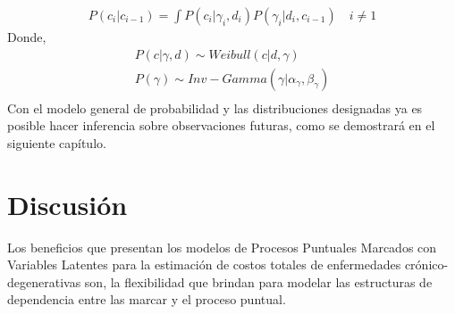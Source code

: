 \begin{align*}
P(c_i|c_{i-1})=\int P(c_i|\gamma_i,d_i)P(\gamma_i|d_i,c_{i-1}) \quad i \neq 1
\end{align*}
Donde,
\begin{align*}
P(c|\gamma,d) \sim Weibull(c|d,\gamma)\\
P(\gamma) \sim Inv-Gamma(\gamma|\alpha_\gamma,\beta_\gamma)\\
\end{align*}
Con el modelo general de probabilidad y las distribuciones designadas ya es posible hacer inferencia sobre observaciones futuras, como se demostrar\'a en el siguiente cap\'itulo.
\section{Discusi\'on}
Los beneficios que presentan los modelos de Procesos Puntuales Marcados con Variables Latentes para la estimaci\'on de costos totales de enfermedades cr\'onico-degenerativas son, la flexibilidad que brindan para modelar las estructuras de dependencia entre las marcar y el proceso puntual. 